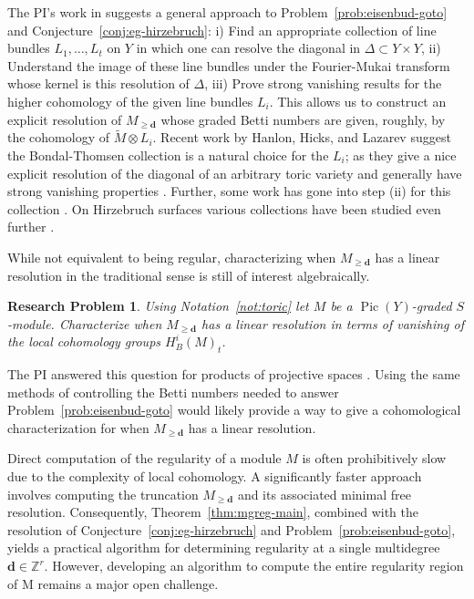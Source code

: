 \documentclass[11pt,reqno]{amsart}
\newtheorem{problem}[lemma]{Research Problem}
\theoremstyle{remark}
\newcommand{\Pic}{\operatorname{Pic}}
\newcommand{\dd}{\mathbf{d}}
\newcommand{\ZZ}{\mathbb{Z}}
\begin{document}
The PI's work in \cite{bruceHellerSayrafi21} suggests a general approach to Problem~\ref{prob:eisenbud-goto} and Conjecture~\ref{conj:eg-hirzebruch}: i) Find an appropriate collection of line bundles $L_1,\ldots,L_t$ on $Y$ in which one can resolve the diagonal in $\Delta \subset Y\times Y$, ii) Understand the image of these line bundles under the Fourier-Mukai transform whose kernel is this resolution of $\Delta$, iii) Prove strong vanishing results for the higher cohomology of the given line bundles $L_i$. This allows us to construct an explicit resolution of $M_{\geq \dd}$ whose graded Betti numbers are given, roughly, by the cohomology of $\tilde{M}\otimes L_i$. Recent work by Hanlon, Hicks, and Lazarev suggest the Bondal-Thomsen collection is a natural choice for the $L_i$; as they give a nice explicit resolution of the diagonal of an arbitrary toric variety and generally have strong vanishing properties   \cite{HHL24,brownErman24-1}. Further, some work has gone into step (ii) for this collection \cite{CH25}. On Hirzebruch surfaces various collections have been studied even further \cite{brownSayrafi24}. 
 
 While not equivalent to being regular, characterizing when $M_{\geq\dd}$ has a linear resolution in the traditional sense is still of interest algebraically.
  
\begin{problem}
 	Using Notation~\ref{not:toric} let $M$ be a $\Pic(Y)$-graded $S$-module.  Characterize when $M_{\geq \dd}$ has a linear resolution in terms of vanishing of the local cohomology groups $H^i_{B}(M)_{t}$. 
\end{problem}

The PI answered this question for products of projective spaces \cite[Theorem 6.2]{bruceHellerSayrafi21}. Using the same methods of controlling the Betti numbers needed to answer Problem~\ref{prob:eisenbud-goto} would likely provide a way to give a cohomological characterization for when $M_{\geq\dd}$ has a linear resolution. 

Direct computation of the regularity of a module $M$ is often prohibitively slow due to the complexity of local cohomology. A significantly faster approach involves computing the truncation $M_{\geq \dd}$ and its associated minimal free resolution. Consequently, Theorem~\ref{thm:mgreg-main}, combined with the resolution of Conjecture~\ref{conj:eg-hirzebruch} and Problem~\ref{prob:eisenbud-goto}, yields a practical algorithm for determining regularity at a single multidegree $\dd\in \ZZ^r$. However, developing an algorithm to compute the entire regularity region of M remains a major open challenge.
\end{document}

